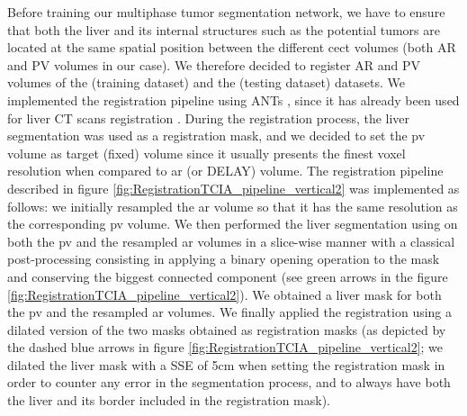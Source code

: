 Before training our multiphase tumor segmentation network, we have to ensure that both the liver and its internal structures such as the potential tumors are located at the same spatial position between
the different \ac{cect} volumes (both AR and PV volumes in our case). We therefore decided to register AR and PV volumes of the \textbf{} (training dataset) and the \textbf{} (testing dataset) datasets.
We implemented the registration pipeline using ANTs \cite{avants2009advanced}, since it has already been used for liver
CT scans registration \cite{Zhao2019,Zhao2020}.
During the registration process, the liver segmentation was used as a
registration mask, and we decided to set the \ac{pv} volume as target (fixed)
volume since it usually presents the finest voxel resolution when
compared to \ac{ar} (or DELAY) volume. The registration pipeline described in figure \ref{fig:RegistrationTCIA_pipeline_vertical2} was implemented as follows: we initially resampled the \ac{ar} volume so that it has the same resolution as the corresponding \ac{pv} volume. We then performed the liver segmentation using  on both the \ac{pv} and the resampled \ac{ar} volumes in a slice-wise manner with a classical post-processing consisting in applying a binary opening operation to the mask and conserving the biggest connected component (see green arrows in the figure \ref{fig:RegistrationTCIA_pipeline_vertical2}). We obtained a liver mask for both the \ac{pv} and the resampled \ac{ar} volumes. We finally applied the registration using a dilated version of the two masks obtained as registration masks (as depicted by the dashed blue arrows in figure \ref{fig:RegistrationTCIA_pipeline_vertical2}; we dilated the liver mask with a SSE of 5cm when setting the registration mask in order to counter any error in the segmentation process, and to always have both the liver and its border included in the registration mask).


